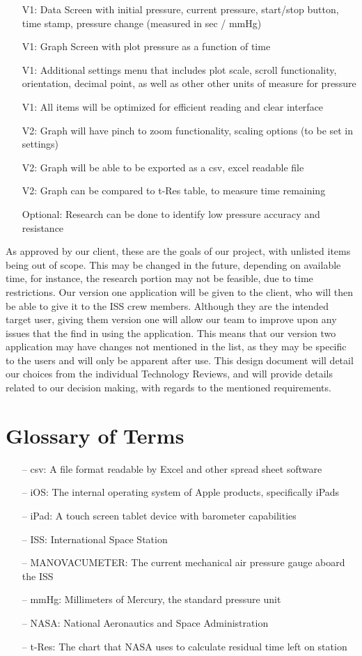 \documentclass[onecolumn, draftclsnofoot,10pt, compsoc]{IEEEtran}
\begin{document}
\begin{itemize}
\item[V1:] Data Screen with initial pressure, current pressure, start/stop button, time stamp, pressure change (measured in sec / mmHg)
\item[V1:] Graph Screen with plot pressure as a function of time
\item[V1:] Additional settings menu that includes plot scale, scroll functionality, orientation, decimal point, as well as other other units of measure for pressure
\item[V1:] All items will be optimized for efficient reading and clear interface
\item[V2:] Graph will have pinch to zoom functionality, scaling options (to be set in settings)
\item[V2:] Graph will be able to be exported as a csv, excel readable file
\item[V2:] Graph can be compared to t-Res table, to measure time remaining
\item[Optional:] Research can be done to identify low pressure accuracy and resistance
\end{itemize}

As approved by our client, these are the goals of our project, with unlisted items being out of scope.
This may be changed in the future, depending on available time, for instance, the research portion may not be feasible, due to time restrictions.
Our version one application will be given to the client, who will then be able to give it to the ISS crew members.
Although they are the intended target user, giving them version one will allow our team to improve upon any issues that the find in using the application.
This means that our version two application may have changes not mentioned in the list, as they may be specific to the users and will only be apparent after use.
This design document will detail our choices from the individual Technology Reviews, and will provide details related to our decision making, with regards to the mentioned requirements.
\cite{udefaultApple}
\section{Glossary of Terms}
\begin{itemize}
\item[--] csv: A file format readable by Excel and other spread sheet software
\item[--] iOS: The internal operating system of Apple products, specifically iPads
\item[--] iPad: A touch screen tablet device with barometer capabilities
\item[--] ISS: International Space Station
\item[--] MANOVACUMETER: The current mechanical air pressure gauge aboard the ISS
\item[--] mmHg: Millimeters of Mercury, the standard pressure unit
\item[--] NASA: National Aeronautics and Space Administration
\item[--] t-Res: The chart that NASA uses to calculate residual time left on station
\end{itemize}
\end{document}
